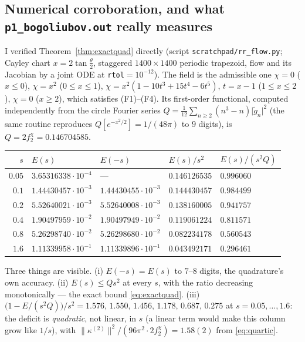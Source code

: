\documentclass[11pt]{article}
\newcommand{\norm}[1]{\lVert#1\rVert}
\newcommand{\abs}[1]{\lvert#1\rvert}
\begin{document}
\subsection{Numerical corroboration, and what \texttt{p1\_bogoliubov.out} really measures}
\label{sec:a-num}

I verified Theorem~\ref{thm:exactquad} directly (script
\texttt{scratchpad/rr\_flow.py}; Cayley chart $x=2\tan\frac\theta2$, staggered $1400\times1400$
periodic trapezoid, flow and its Jacobian by a joint ODE at \texttt{rtol}$=10^{-12}$).  The field is
the admissible one $\chi=0$ ($x\le0$), $\chi=x^2$ ($0\le x\le1$),
$\chi=x^2(1-10t^3+15t^4-6t^5)$, $t=x-1$ ($1\le x\le2$), $\chi=0$ ($x\ge2$), which satisfies
(F1)--(F4).  Its first-order functional, computed independently from the circle Fourier series
$Q=\frac1{12}\sum_{n\ge2}(n^3-n)\abs{\tilde g_n}^2$ (the same routine reproduces
$Q[e^{-x^2/2}]=1/(48\pi)$ to $9$ digits), is $Q=2f_2^\chi=0.146704585$.

\begin{center}\small
\begin{tabular}{r l l l l}\toprule
$s$ & $E(s)$ & $E(-s)$ & $E(s)/s^2$ & $E(s)/(s^2Q)$\\\midrule
$0.05$ & $3.65316338\cdot10^{-4}$ & --- & $0.146126535$ & $0.996060$\\
$0.1$ & $1.44430457\cdot10^{-3}$ & $1.44430455\cdot10^{-3}$ & $0.144430457$ & $0.984499$\\
$0.2$ & $5.52640021\cdot10^{-3}$ & $5.52640008\cdot10^{-3}$ & $0.138160005$ & $0.941757$\\
$0.4$ & $1.90497959\cdot10^{-2}$ & $1.90497949\cdot10^{-2}$ & $0.119061224$ & $0.811571$\\
$0.8$ & $5.26298740\cdot10^{-2}$ & $5.26298680\cdot10^{-2}$ & $0.082234178$ & $0.560543$\\
$1.6$ & $1.11339958\cdot10^{-1}$ & $1.11339896\cdot10^{-1}$ & $0.043492171$ & $0.296461$\\
\bottomrule\end{tabular}\end{center}

Three things are visible.  (i) $E(-s)=E(s)$ to $7$--$8$ digits, the quadrature's own accuracy.
(ii) $E(s)\le Qs^2$ at every $s$, with the ratio decreasing monotonically --- the exact bound
\eqref{eq:exactquad}.  (iii) $\bigl(1-E/(s^2Q)\bigr)/s^2=1.576,\,1.550,\,1.456,\,1.178,\,0.687,
\,0.275$ at $s=0.05,\dots,1.6$: the deficit is \emph{quadratic}, not linear, in $s$
(a linear term would make this column grow like $1/s$), with
$\norm{\kappa^{(2)}}^2/(96\pi^2\cdot2f_2^\chi)=1.58(2)$ from \eqref{eq:quartic}.
\end{document}
